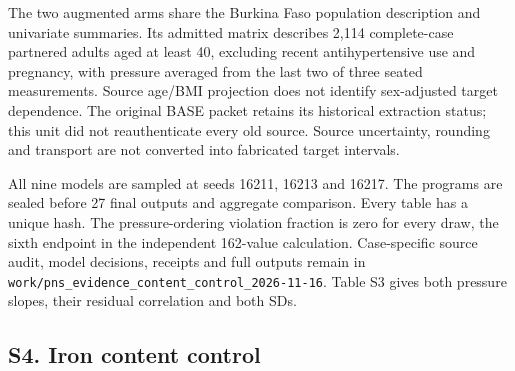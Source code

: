\documentclass[sigconf,anonymous,nonacm]{acmart}
\begin{document}
The two augmented arms share the Burkina Faso population description and univariate summaries. Its admitted matrix describes 2,114 complete-case partnered adults aged at least 40, excluding recent antihypertensive use and pregnancy, with pressure averaged from the last two of three seated measurements. Source age/\allowbreak{}BMI projection does not identify sex-adjusted target dependence. The original BASE packet retains its historical extraction status; this unit did not reauthenticate every old source. Source uncertainty, rounding and transport are not converted into fabricated target intervals.


All nine models are sampled at seeds 16211, 16213 and 16217. The programs are sealed before 27 final outputs and aggregate comparison. Every table has a unique hash. The pressure-ordering violation fraction is zero for every draw, the sixth endpoint in the independent 162-value calculation. Case-specific source audit, model decisions, receipts and full outputs remain in \texttt{work/\allowbreak{}pns\_\allowbreak{}evidence\_\allowbreak{}content\_\allowbreak{}control\_\allowbreak{}2026-\allowbreak{}11-\allowbreak{}16}. Table S3 gives both pressure slopes, their residual correlation and both SDs.



\subsection*{S4. Iron content control}
\end{document}
